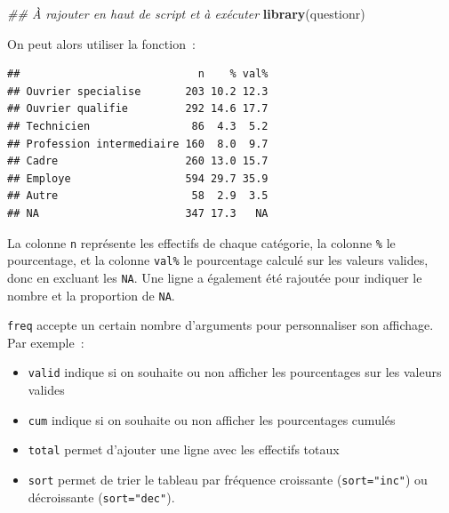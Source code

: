 \documentclass[
  12pt,
]{book}
\newenvironment{Shaded}{\begin{snugshade}}{\end{snugshade}}
\newcommand{\CommentTok}[1]{\textcolor[rgb]{0.56,0.35,0.01}{\textit{#1}}}
\newcommand{\DataTypeTok}[1]{\textcolor[rgb]{0.13,0.29,0.53}{#1}}
\newcommand{\KeywordTok}[1]{\textcolor[rgb]{0.13,0.29,0.53}{\textbf{#1}}}
\newcommand{\NormalTok}[1]{#1}
\newcommand{\OperatorTok}[1]{\textcolor[rgb]{0.81,0.36,0.00}{\textbf{#1}}}
\newcommand{\OtherTok}[1]{\textcolor[rgb]{0.56,0.35,0.01}{#1}}
\newcommand{\StringTok}[1]{\textcolor[rgb]{0.31,0.60,0.02}{#1}}
\providecommand{\tightlist}{%
  \setlength{\itemsep}{0pt}\setlength{\parskip}{0pt}}
\begin{document}
\begin{Shaded}
\begin{Highlighting}[]
\CommentTok{\#\# À rajouter en haut de script et à exécuter}
\KeywordTok{library}\NormalTok{(questionr)}
\end{Highlighting}
\end{Shaded}

On peut alors utiliser la fonction~:

\begin{Shaded}
\end{Shaded}

\begin{verbatim}
##                            n    % val%
## Ouvrier specialise       203 10.2 12.3
## Ouvrier qualifie         292 14.6 17.7
## Technicien                86  4.3  5.2
## Profession intermediaire 160  8.0  9.7
## Cadre                    260 13.0 15.7
## Employe                  594 29.7 35.9
## Autre                     58  2.9  3.5
## NA                       347 17.3   NA
\end{verbatim}

La colonne \texttt{n} représente les effectifs de chaque catégorie, la colonne \texttt{\%} le pourcentage, et la colonne \texttt{val\%} le pourcentage calculé sur les valeurs valides, donc en excluant les \texttt{NA}. Une ligne a également été rajoutée pour indiquer le nombre et la proportion de \texttt{NA}.

\texttt{freq} accepte un certain nombre d'arguments pour personnaliser son affichage. Par exemple~:

\begin{itemize}
\tightlist
\item
  \texttt{valid} indique si on souhaite ou non afficher les pourcentages sur les valeurs valides
\item
  \texttt{cum} indique si on souhaite ou non afficher les pourcentages cumulés
\item
  \texttt{total} permet d'ajouter une ligne avec les effectifs totaux
\item
  \texttt{sort} permet de trier le tableau par fréquence croissante (\texttt{sort="inc"}) ou décroissante (\texttt{sort="dec"}).
\end{itemize}

\begin{Shaded}
\end{Shaded}
\end{document}
